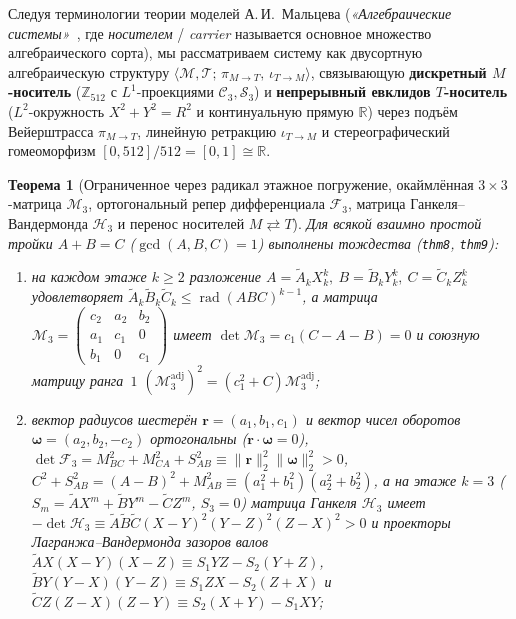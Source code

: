 \documentclass[11pt,a4paper]{article}
\theoremstyle{plain}
\newtheorem{theorem}{Теорема}[section]
\theoremstyle{definition}
\begin{document}
Следуя терминологии теории моделей А.\,И.~Мальцева (\emph{«Алгебраические системы»}~\cite{Malcev1970}, где \emph{носителем} / \emph{carrier} называется основное множество алгебраического сорта), мы рассматриваем систему как двусортную алгебраическую структуру $\langle\mathcal{M},\mathcal{T};\,\pi_{M\to T},\,\iota_{T\to M}\rangle$, связывающую \textbf{дискретный $M$-носитель} ($\mathbb{Z}_{512}$ с $L^1$-проекциями $\mathcal{C}_3,\mathcal{S}_3$) и \textbf{непрерывный евклидов $T$-носитель} ($L^2$-окружность $X^2+Y^2=R^2$ и континуальную прямую $\mathbb{R}$) через подъём Вейерштрасса $\pi_{M\to T}$, линейную ретракцию $\iota_{T\to M}$ и стереографический гомеоморфизм $[0,512]/512 = [0,1]\cong\mathbb{R}$.

\begin{theorem}[Ограниченное через радикал этажное погружение, окаймлённая $3\times 3$-матрица $\mathcal{M}_3$, ортогональный репер дифференциала $\mathcal{F}_3$, матрица Ганкеля--Вандермонда $\mathcal{H}_3$ и перенос носителей $M\rightleftarrows T$]
\label{thm:main-8}
Для всякой взаимно простой тройки $A + B = C$ ($\gcd(A,B,C)=1$) выполнены тождества (\texttt{thm8}, \texttt{thm9}):
\begin{enumerate}[label=\textbf{(\roman*)},leftmargin=*]
\item на каждом этаже $k\ge 2$ разложение $A = \widetilde{A}_k X_k^k,\ B = \widetilde{B}_k Y_k^k,\ C = \widetilde{C}_k Z_k^k$ удовлетворяет $\widetilde{A}_k\widetilde{B}_k\widetilde{C}_k \le \operatorname{rad}(ABC)^{k-1}$, а матрица $\mathcal{M}_3 = \begin{pmatrix} c_2 & a_2 & b_2 \\ a_1 & c_1 & 0 \\ b_1 & 0 & c_1 \end{pmatrix}$ имеет $\det\mathcal{M}_3 = c_1(C-A-B) = 0$ и союзную матрицу ранга~$1$ $(\mathcal{M}_3^{\mathrm{adj}})^2 = (c_1^2+C)\mathcal{M}_3^{\mathrm{adj}}$;
\item вектор радиусов шестерён $\mathbf{r} = (a_1,b_1,c_1)$ и вектор чисел оборотов $\mathbf{\omega} = (a_2,b_2,-c_2)$ ортогональны ($\mathbf{r}\cdot\mathbf{\omega} = 0$), $\det\mathcal{F}_3 = M_{BC}^2 + M_{CA}^2 + S_{AB}^2 \equiv \|\mathbf{r}\|_2^2\|\mathbf{\omega}\|_2^2 > 0$, $C^2 + S_{AB}^2 = (A-B)^2 + M_{AB}^2 \equiv (a_1^2+b_1^2)(a_2^2+b_2^2)$, а на этаже $k=3$ ($S_m = \widetilde{A}X^m + \widetilde{B}Y^m - \widetilde{C}Z^m$, $S_3 = 0$) матрица Ганкеля $\mathcal{H}_3$ имеет $-\det\mathcal{H}_3 \equiv \widetilde{A}\widetilde{B}\widetilde{C}(X-Y)^2(Y-Z)^2(Z-X)^2 > 0$ и проекторы Лагранжа--Вандермонда зазоров валов $\widetilde{A}X(X-Y)(X-Z) \equiv S_1 YZ - S_2(Y+Z)$, $\widetilde{B}Y(Y-X)(Y-Z) \equiv S_1 ZX - S_2(Z+X)$ и $\widetilde{C}Z(Z-X)(Z-Y) \equiv S_2(X+Y) - S_1 XY$;

\end{enumerate}
\end{theorem}
\end{document}
